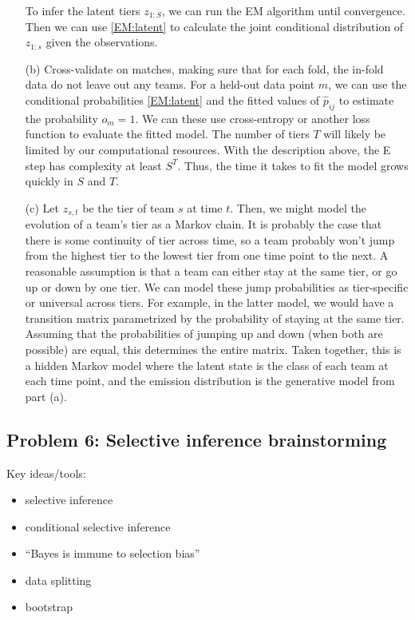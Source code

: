 \begin{enumerate}
	To infer the latent tiers $z_{1:S}$, we can run the EM algorithm until convergence. Then we can use \eqref{EM:latent} to calculate the joint conditional distribution of $z_{1:s}$ given the observations.
	

	
	\item[(b)] Cross-validate on matches, making sure that for each fold, the in-fold data do not leave out any teams. For a held-out data point $m$, we can use the conditional probabilities \eqref{EM:latent} and the fitted values of $\hat{p}_{ij}$ to estimate the probability $o_m=1$. We can these use cross-entropy or another loss function to evaluate the fitted model. The number of tiers $T$ will likely be limited by our computational resources. With the description above, the E step has complexity at least $S^T$. Thus, the time it takes to fit the model grows quickly in $S$ and $T$.
	
	\item[(c)] Let $z_{s, t}$ be the tier of team $s$ at time $t$. Then, we might model the evolution of a team's tier as a Markov chain. It is probably the case that there is some continuity of tier across time, so a team probably won't jump from the highest tier to the lowest tier from one time point to the next. A reasonable assumption is that a team can either stay at the same tier, or go up or down by one tier. We can model these jump probabilities as tier-specific or universal across tiers. For example, in the latter model, we would have a transition matrix parametrized by the probability of staying at the same tier. Assuming that the probabilities of jumping up and down (when both are possible) are equal, this determines the entire matrix. Taken together, this is a hidden Markov model where the latent state is the class of each team at each time point, and the emission distribution is the generative model from part (a).
\end{enumerate}	



\subsection*{Problem 6: Selective inference brainstorming}
Key ideas/tools:
\begin{itemize}
	\item  selective inference
	\item conditional selective inference
	\item ``Bayes is immune to selection bias''
	\item data splitting
	\item bootstrap
\end{itemize}

